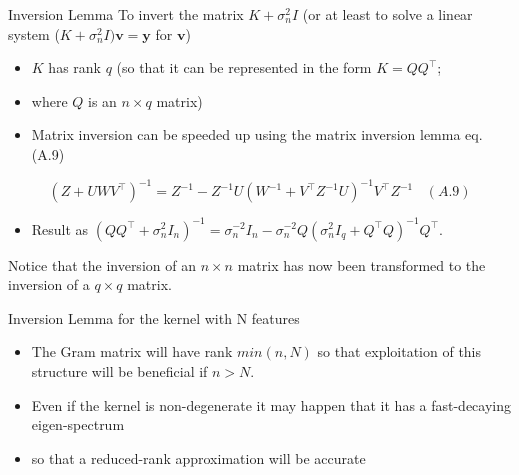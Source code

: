 \documentclass[
  ignorenonframetext,
]{beamer}
\providecommand{\tightlist}{%
  \setlength{\itemsep}{0pt}\setlength{\parskip}{0pt}}
\begin{document}
\begin{frame}{Inversion Lemma}
\protect\hypertarget{inversion-lemma}{}
To invert the matrix \(K + \sigma_n^2 I\) (or at least to solve a linear
system (\(K + \sigma_n^2 I)\pmb v = \pmb y\) for \(\pmb v\))

\begin{itemize}
\item
  \(K\) has rank \(q\) (so that it can be represented in the form
  \(K = QQ^{\top}\);
\item
  where \(Q\) is an \(n \times q\) matrix)
\item
  Matrix inversion can be speeded up using the matrix inversion lemma
  eq. (A.9)
\end{itemize}

\[
(Z + UWV^{\top})^{-1} = Z^{-1} - Z^{-1}U(W^{-1} + V^{\top}Z^{-1}U)^{-1}V^{\top}Z^{-1} \ \ \ \ (A.9)
\]

\begin{itemize}
\tightlist
\item
  Result as
  \((QQ^{\top} + \sigma_n^2I_n)^{-1} = \sigma_n^{-2} I_n - \sigma_n^{-2} Q(\sigma_n^2 I_q + Q^{\top} Q)^{-1}Q^{\top}\).
\end{itemize}

\alert{Notice that the inversion of an $n \times n$ matrix has now been transformed to the inversion of a $q \times q$ matrix.}
\end{frame}

\begin{frame}{Inversion Lemma for the kernel with N features}
\protect\hypertarget{inversion-lemma-for-the-kernel-with-n-features}{}
\begin{itemize}
\item
  The Gram matrix will have rank \(min(n, N)\) so that exploitation of
  this structure will be beneficial if \(n > N\).
\item
  Even if the kernel is non-degenerate it may happen that it has a
  fast-decaying eigen-spectrum
\item
  so that a reduced-rank approximation will be accurate
\end{itemize}
\end{frame}
\end{document}
